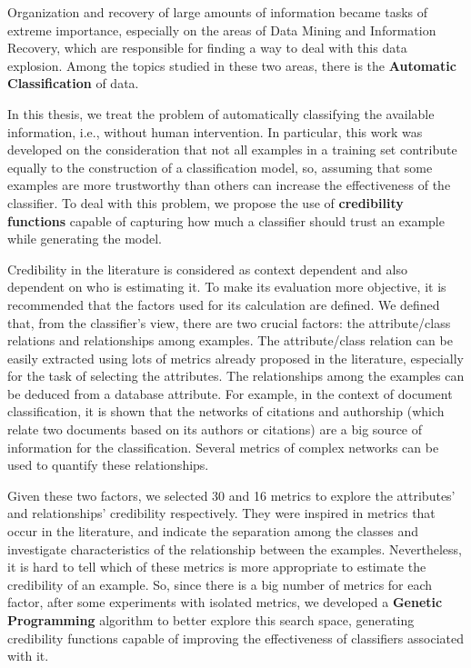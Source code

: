 Organization and recovery of large amounts of information became tasks of
extreme importance, especially on the areas of Data Mining and Information
Recovery, which are responsible for finding a way to deal with this data
explosion. Among the topics studied in these two areas, there is the
\textbf{Automatic Classification} of data.

In this thesis, we treat the problem of automatically classifying the available
information, i.e., without human intervention. In particular, this work was
developed on the consideration that not all examples in a training set
contribute equally to the construction of a classification model, so, assuming
that some examples are more trustworthy than others can increase the
effectiveness of the classifier. To deal with this problem, we propose the use of
\textbf{credibility functions} capable of capturing how much a classifier should
trust an example while generating the model.

Credibility in the literature is considered as context dependent and also dependent on who is estimating it.
To make its evaluation more objective, it is recommended that the factors used
for its calculation are defined.
We defined that, from the classifier's view, there are two crucial factors: the
attribute/class relations and relationships among examples. The attribute/class
relation can be easily extracted using lots of metrics already proposed in the
literature, especially for the task of selecting the attributes. The
relationships among the examples can be deduced from a database attribute. For
example, in the context of document classification, it is shown that the
networks of citations and authorship (which relate two documents based on its
authors or citations) are a big source of information for the classification.
Several metrics of complex networks can be used to quantify these relationships.

Given these two factors, we selected 30 and 16 metrics to explore the 
attributes' and relationships' credibility respectively. They were inspired in
metrics that occur in the literature, and indicate the separation among the
classes and investigate characteristics of the relationship between the
examples. Nevertheless, it is hard to tell which of these metrics is more
appropriate to estimate the credibility of an example. So, since there is a big
number of metrics for each factor, after some experiments with isolated metrics,
we developed a \textbf{Genetic Programming} algorithm to better explore this
search space, generating credibility functions capable of improving the
effectiveness of classifiers associated with it.

